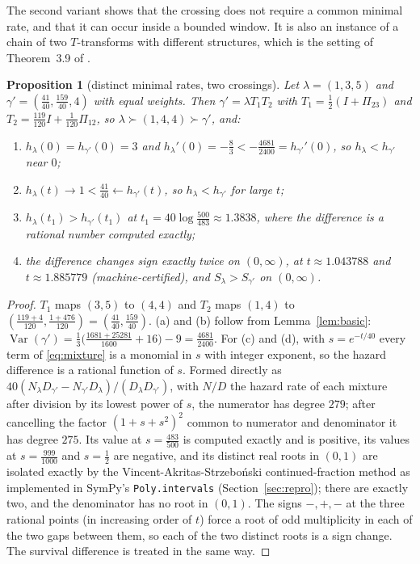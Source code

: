 \documentclass[10pt]{article}
\theoremstyle{plain}
\newtheorem{proposition}[theorem]{Proposition}
\theoremstyle{definition}
\theoremstyle{remark}
\DeclareMathOperator{\Var}{Var}
\begin{document}
The second variant shows that the crossing does not require a common minimal rate, and that it can occur inside a bounded window. It is also an instance of a chain of two $T$-transforms with different structures, which is the setting of Theorem~3.9 of \cite{SahooKayalFinkelstein2026}.

\begin{proposition}[distinct minimal rates, two crossings]\label{prop:twocross}
Let $\lambda=(1,3,5)$ and $\gamma'=(\tfrac{41}{40},\tfrac{159}{40},4)$ with equal weights. Then $\gamma'=\lambda T_1T_2$ with $T_1=\tfrac12(I+\Pi_{23})$ and $T_2=\tfrac{119}{120}I+\tfrac1{120}\Pi_{12}$, so $\lambda\succ(1,4,4)\succ\gamma'$, and:
\begin{enumerate}
\item[(a)] $h_\lambda(0)=h_{\gamma'}(0)=3$ and $h_\lambda'(0)=-\tfrac83<-\tfrac{4681}{2400}=h_{\gamma'}'(0)$, so $h_\lambda<h_{\gamma'}$ near $0$;
\item[(b)] $h_\lambda(t)\to 1<\tfrac{41}{40}\leftarrow h_{\gamma'}(t)$, so $h_\lambda<h_{\gamma'}$ for large $t$;
\item[(c)] $h_\lambda(t_1)>h_{\gamma'}(t_1)$ at $t_1=40\log\tfrac{500}{483}\approx 1.3838$, where the difference is a rational number computed exactly;
\item[(d)] the difference changes sign exactly twice on $(0,\infty)$, at $t\approx 1.043788$ and $t\approx 1.885779$ (machine-certified), and $S_\lambda>S_{\gamma'}$ on $(0,\infty)$.
\end{enumerate}
\end{proposition}

\begin{proof}
$T_1$ maps $(3,5)$ to $(4,4)$ and $T_2$ maps $(1,4)$ to $(\tfrac{119+4}{120},\tfrac{1+476}{120})=(\tfrac{41}{40},\tfrac{159}{40})$. (a) and (b) follow from Lemma~\ref{lem:basic}: $\Var(\gamma')=\tfrac13\bigl(\tfrac{1681+25281}{1600}+16\bigr)-9=\tfrac{4681}{2400}$. For (c) and (d), with $s=e^{-t/40}$ every term of \eqref{eq:mixture} is a monomial in $s$ with integer exponent, so the hazard difference is a rational function of $s$. Formed directly as $40(N_\lambda D_{\gamma'}-N_{\gamma'}D_\lambda)/(D_\lambda D_{\gamma'})$, with $N/D$ the hazard rate of each mixture after division by its lowest power of $s$, the numerator has degree $279$; after cancelling the factor $(1+s+s^2)^2$ common to numerator and denominator it has degree $275$. Its value at $s=\tfrac{483}{500}$ is computed exactly and is positive, its values at $s=\tfrac{999}{1000}$ and $s=\tfrac12$ are negative, and its distinct real roots in $(0,1)$ are isolated exactly by the Vincent-Akritas-Strzebo\'nski continued-fraction method as implemented in SymPy's \texttt{Poly.intervals} \cite{AkritasStrzebonski2005} (Section~\ref{sec:repro}); there are exactly two, and the denominator has no root in $(0,1)$. The signs $-,+,-$ at the three rational points (in increasing order of $t$) force a root of odd multiplicity in each of the two gaps between them, so each of the two distinct roots is a sign change. The survival difference is treated in the same way.
\end{proof}
\end{document}
